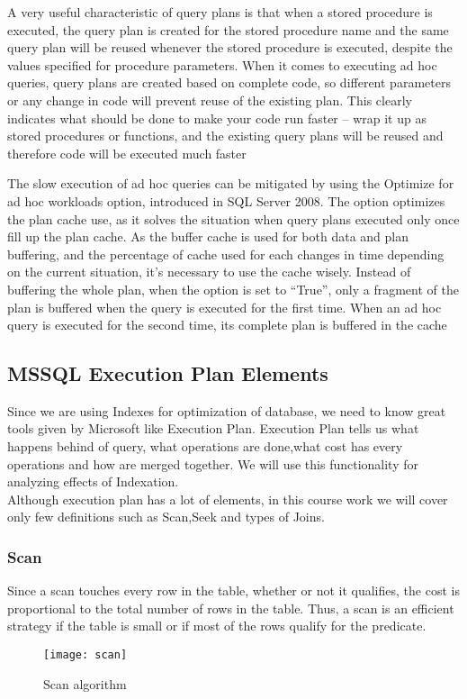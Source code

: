 A very useful characteristic of query plans is that when a stored procedure is executed, the query plan is created for the stored procedure name and the same query plan will be reused whenever the stored procedure is executed, despite the values specified for procedure parameters. When it comes to executing ad hoc queries, query plans are created based on complete code, so different parameters or any change in code will prevent reuse of the existing plan. This clearly indicates what should be done to make your code run faster – wrap it up as stored procedures or functions, and the existing query plans will be reused and therefore code will be executed much faster

The slow execution of ad hoc queries can be mitigated by using the Optimize for ad hoc workloads option, introduced in SQL Server 2008. The option optimizes the plan cache use, as it solves the situation when query plans executed only once fill up the plan cache. As the buffer cache is used for both data and plan buffering, and the percentage of cache used for each changes in time depending on the current situation, it’s necessary to use the cache wisely. Instead of buffering the whole plan, when the option is set to “True”, only a fragment of the plan is buffered when the query is executed for the first time. When an ad hoc query is executed for the second time, its complete plan is buffered in the cache


\subsection{MSSQL Execution Plan Elements}
Since we are using Indexes for optimization of database, we need to know great tools given by Microsoft like Execution Plan. Execution Plan tells us what happens behind of query, what operations are done,what cost has every operations and how are merged together. We will use this functionality for analyzing effects of Indexation. 
\\
Although execution plan has a lot of elements, in this course work we will cover only few definitions such as Scan,Seek and types of Joins. 

\subsubsection{Scan}
Since a scan touches every row in the table, whether or not it qualifies, the cost is proportional to the total number of rows in the table. Thus, a scan is an efficient strategy if the table is small or if most of the rows qualify for the predicate.
\begin{figure}[ht!]
	\centering
	\texttt{[image: scan]}
	\caption{Scan algorithm}
\end{figure}

